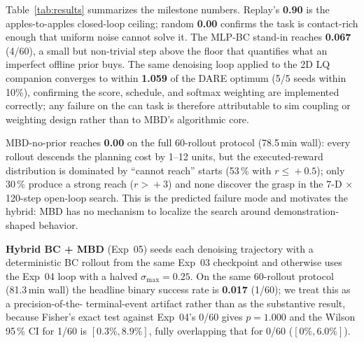 \documentclass[letterpaper, 10 pt, conference]{ieeeconf}
\begin{document}
Table~\ref{tab:results} summarizes the milestone numbers. Replay's
\textbf{0.90} is the apples-to-apples closed-loop ceiling; random
\textbf{0.00} confirms the task is contact-rich enough that
uniform noise cannot solve it. The MLP-BC stand-in reaches
\textbf{0.067} (4/60), a small but non-trivial step above the
floor that quantifies what an imperfect offline prior buys.
The same denoising loop applied to the 2D LQ companion converges
to within \textbf{1.059} of the DARE optimum (5/5 seeds within
10\%), confirming the score, schedule, and softmax weighting are
implemented correctly; any failure on the can task is therefore
attributable to sim coupling or weighting design rather than to
MBD's algorithmic core.

MBD-no-prior reaches \textbf{0.00} on the full 60-rollout protocol
(78.5\,min wall): every rollout descends the planning cost by
1--12 units, but the executed-reward distribution is dominated by
``cannot reach'' starts (53\,\% with $r\!\le\!+0.5$); only 30\,\%
produce a strong reach ($r\!>\!+3$) and none discover the grasp
in the 7-D$\,\times\,$120-step open-loop search. This is the
predicted failure mode and motivates the hybrid: MBD has no
mechanism to localize the search around demonstration-shaped
behavior.

\textbf{Hybrid BC + MBD} (Exp~05) seeds each denoising trajectory
with a deterministic BC rollout from the same Exp~03 checkpoint
and otherwise uses the Exp~04 loop with a halved
$\sigma_{\max}\!=\!0.25$. On the same 60-rollout protocol
(81.3\,min wall) the headline binary success rate is
\textbf{0.017} (1/60); we treat this as a precision-of-the-
terminal-event artifact rather than as the substantive result,
because Fisher's exact test against Exp~04's 0/60 gives
$p\!=\!1.000$ and the Wilson 95\,\% CI for 1/60 is
$[0.3\%,8.9\%]$, fully overlapping that for 0/60 ($[0\%,6.0\%]$).
\end{document}
